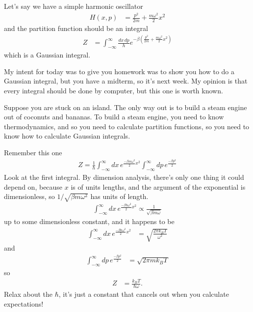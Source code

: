\begin{example}
    Let's say we have a simple harmonic oscillator
    \begin{align}
        H(x, p) &=
        \frac{p^2}{2m} + \frac{m\omega^2}{2}x^2
    \end{align}
    and the partition function should be an integral
    \begin{align}
        Z &=
        \int_{-\infty}^{\infty}\frac{dx\,dp}{h}
        e^{-\beta\left(
            \frac{p^2}{2m} + \frac{m\omega^2}{2}x^2
        \right)}
    \end{align}
    which is a Gaussian integral.
\end{example}
My intent for today was to give you homework was to show you how to do a
Gaussian integral,
but you have a midterm,
so it's next week.
My opinion is that every integral should be done by computer,
but this one is worth known.

Suppose you are stuck on an island.
The only way out is to build a steam engine out of coconuts and bananas.
To build a steam engine,
you need to know thermodynamics,
and so you need to calculate partition functions,
so you need to know how to calculate Gaussian integrals.

Remember this one
\begin{align}
    Z = \frac{1}{h}
    \int_{-\infty}^{\infty} dx\,
    e^{\frac{-\beta m\omega^2}{2} x^2}
    \int_{-\infty}^{\infty} dp\,
    e^{\frac{-\beta p^2}{2}}
\end{align}
Look at the first integral. By dimension analysis,
there's only one thing it could depend on,
because $x$ is of units lengths,
and the argument of the exponential is dimensionless,
so $1/\sqrt{\beta m \omega^2}$ has units of length.
\begin{align}
    \int_{-\infty}^{\infty} dx\,
    e^{\frac{-\beta\hbar\omega^2}{2} x^2}
    \propto
    \frac{1}{\sqrt{\beta m \omega}}
\end{align}
up to some dimensionless constant, and it happens to be
\begin{align}
    \int_{-\infty}^{\infty} dx\,
    e^{\frac{-\beta\hbar\omega^2}{2} x^2}
    &=
    \sqrt{\frac{2\pi k_B T}{\omega^2}}
\end{align}
and
\begin{align}
    \int_{-\infty}^{\infty} dp\,
    e^{\frac{-\beta p^2}{2}}
    &=
    \sqrt{2\pi m k_B T}
\end{align}
so
\begin{align}
    Z &= \frac{k_B T}{\hbar \omega}.
\end{align}
Relax about the $\hbar$, it's just a constant that cancels out when
you calculate expectations!

